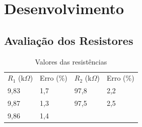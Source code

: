 \documentclass[14pt, oneside]{book}
\theoremstyle{definition}
\begin{document}
                
        \chapter{Desenvolvimento}
        
            \section{Avaliação dos Resistores}
            
               
                							


                \begin{table}[h]
                    \centering
                    \label{resistores}
                    {\renewcommand\arraystretch{1.25}
                    \caption{Valores das resistências}
                    \begin{tabular}{ l l l l }
                        \cline{1-1}\cline{2-2}\cline{3-3}\cline{4-4}  
                            \multicolumn{1}{|p{3.033cm}|}{$R_1$ (k$\Omega$) \centering } &
                            \multicolumn{1}{p{2.267cm}|}{Erro (\%) \centering } &
                            \multicolumn{1}{p{4.217cm}|}{$R_2$ (k$\Omega$)\centering } &
                            \multicolumn{1}{p{4.217cm}|}{Erro (\%) \centering }
                  \\  
                        \cline{1-1}\cline{2-2}\cline{3-3}\cline{4-4}  
                            \multicolumn{1}{|p{3.033cm}|}{9,83 \centering } &
                            \multicolumn{1}{p{2.267cm}|}{1,7 \centering } &
                            \multicolumn{1}{p{4.217cm}|}{97,8 \centering } &
                            \multicolumn{1}{p{4.217cm}|}{2,2 \centering }
                  \\  
                        \cline{1-1}\cline{2-2}\cline{3-3}\cline{4-4}  
                            \multicolumn{1}{|p{3.033cm}|}{9,87 \centering } &
                            \multicolumn{1}{p{2.267cm}|}{1,3 \centering } &
                            \multicolumn{1}{p{4.217cm}|}{97,5 \centering } &
                            \multicolumn{1}{p{4.217cm}|}{2,5 \centering }
                  \\  
                        \cline{1-1}\cline{2-2}\cline{3-3}\cline{4-4}  
                            \multicolumn{1}{|p{3.033cm}|}{9,86 \centering } &
                            \multicolumn{1}{p{2.267cm}|}{1,4 \centering } &

\end{tabular}}
\end{table}
\end{document}
